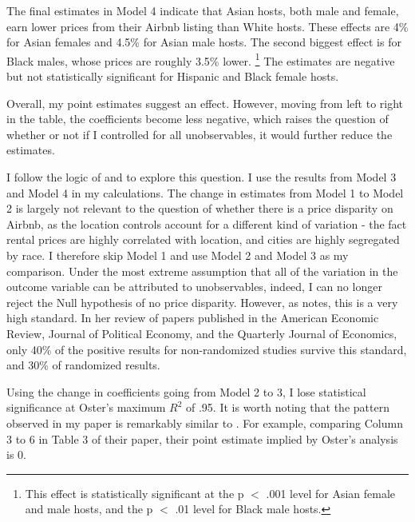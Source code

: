 The final estimates in Model 4 indicate that Asian hosts, both male and female, earn lower prices from their Airbnb listing than White hosts. These effects are 4\% for Asian females and 4.5\% for Asian male hosts. The second biggest effect is for Black males, whose prices are roughly 3.5\% lower.%
	\footnote{This effect is statistically significant at the p $<$ .001 level for Asian female and male hosts, and the p $<$ .01 level for Black male hosts.} 
The estimates are negative but not statistically significant for Hispanic and Black female hosts. 

Overall, my point estimates suggest an effect. However, moving from left to right in the table, the coefficients become less negative, which raises the question of whether or not if I controlled for all unobservables, it would further reduce the estimates. 

I follow the logic of \cite{oster} and \cite{altonji} to explore this question. I use the results from Model 3 and Model 4 in my calculations. The change in estimates from Model 1 to Model 2 is largely not relevant to the question of whether there is a price disparity on Airbnb, as the location controls account for a different kind of variation - the fact rental prices are highly correlated with location, and cities are highly segregated by race. I therefore skip Model 1 and use Model 2 and Model 3 as my comparison. Under the most extreme assumption that all of the variation in the outcome variable can be attributed to unobservables, indeed, I can no longer reject the Null hypothesis of no price disparity. However, as \cite{oster} notes, this is a very high standard. In her review of papers published in the American Economic Review, Journal of Political Economy, and the Quarterly Journal of Economics, only 40\% of the positive results for non-randomized studies survive this standard, and 30\% of randomized results. 

Using the change in coefficients going from Model 2 to 3, I lose statistical significance at Oster’s maximum $R^2$ of .95. It is worth noting that the pattern observed in my paper is remarkably similar to \cite{kakar}. For example, comparing Column 3 to 6 in Table 3 of their paper, their point estimate implied by Oster's analysis is 0. 


